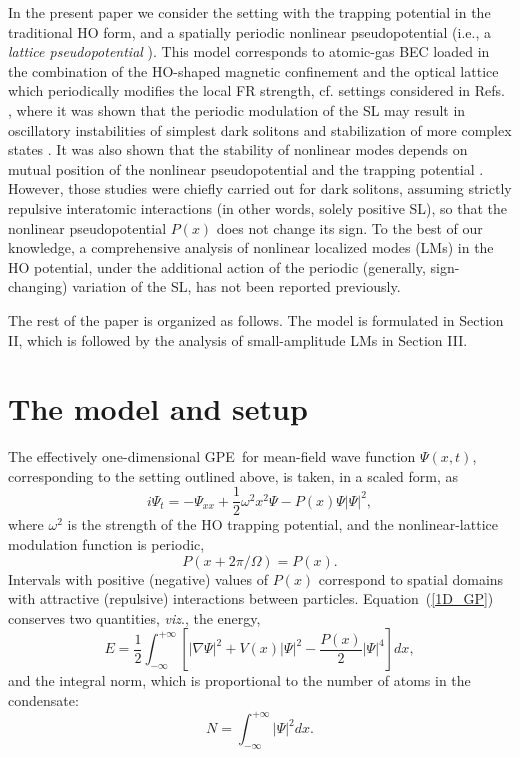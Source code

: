 \documentclass[aps,preprint,showkeys,
]{revtex4}
\begin{document}
In the present paper we consider the setting with the trapping potential in
the traditional HO form, and a spatially periodic nonlinear pseudopotential
(i.e., a \textit{lattice pseudopotential }\cite{KMT11}). This model
corresponds to atomic-gas BEC loaded in the combination of the HO-shaped
magnetic confinement and the optical lattice which periodically modifies the
local FR strength, cf. settings considered in Refs. \cite{WLK13,K17}, where
it was shown that the periodic modulation of the SL may result in
oscillatory instabilities of simplest dark solitons and stabilization of
more complex states \cite{K17}. It was also shown that the stability of
nonlinear modes depends on mutual position of the nonlinear pseudopotential
and the trapping potential \cite{WLK13}. However, those studies were chiefly
carried out for dark solitons, assuming strictly repulsive interatomic
interactions (in other words, solely positive SL), so that the nonlinear
pseudopotential $P(x)$ does not change its sign. To the best of our
knowledge, a comprehensive analysis of nonlinear localized modes (LMs) in
the HO potential, under the additional action of the periodic (generally,
sign-changing) variation of the SL, has not been reported previously.

The rest of the paper is organized as follows. The model is formulated in
Section II, which is followed by the analysis of small-amplitude LMs in
Section III.

\section{The model and setup}

\label{M_S}

The effectively one-dimensional GPE\ for mean-field wave function $\Psi
\left( x,t\right) $, corresponding to the setting outlined above, is taken,
in a scaled form, as
\begin{equation}
i\Psi _{t}=-\Psi _{xx}+\frac{1}{2}\omega ^{2}x^{2}\Psi -P(x)\Psi |\Psi |^{2},
\label{1D_GP}
\end{equation}%
where $\omega ^{2}$ is the strength of the HO trapping potential, and the
nonlinear-lattice modulation function is periodic,%
\begin{equation}
P(x+2\pi /\Omega )=P(x).  \label{P(x)}
\end{equation}%
Intervals with positive (negative) values of $P(x)$ correspond to spatial
domains with attractive (repulsive) interactions between particles.
Equation~(\ref{1D_GP}) conserves two quantities, \textit{viz}., the energy,
\begin{equation}
E=\frac{1}{2}\int_{-\infty }^{+\infty }\left[ |\nabla \Psi |^{2}+V(x)|\Psi
|^{2}-\frac{P(x)}{2}|\Psi |^{4}\right] dx,  \label{N_E}
\end{equation}%
and the integral norm, which is proportional to the number of atoms in the
condensate:
\begin{equation}
N=\int_{-\infty }^{+\infty }|\Psi |^{2}dx.  \label{N_N}
\end{equation}
\end{document}
